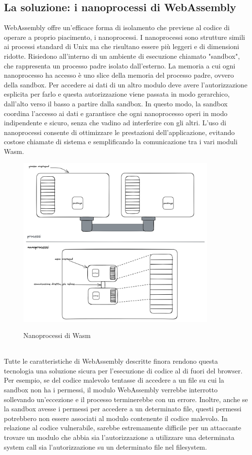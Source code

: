 \subsection{La soluzione: i nanoprocessi di WebAssembly}
WebAssembly offre un'efficace forma di isolamento che previene al codice di operare a proprio piacimento, i
nanoprocessi\cite{wasm-nano-processes}. I nanoprocessi sono strutture simili ai processi standard di Unix ma che
risultano essere più leggeri e di dimensioni ridotte. Risiedono all'interno di un ambiente di esecuzione chiamato
"sandbox", che rappresenta un processo padre isolato dall'esterno. La memoria a cui ogni nanoprocesso ha accesso è uno
slice della memoria del processo padre, ovvero della sandbox. Per accedere ai dati di un altro modulo deve avere
l'autorizzazione esplicita per farlo e questa autorizzazione viene passata in modo gerarchico, dall'alto verso il basso
a partire dalla sandbox. In questo modo, la sandbox coordina l'accesso ai dati e garantisce che ogni nanoprocesso operi
in modo indipendente e sicuro, senza che vadino ad interferire con gli altri. L'uso di nanoprocessi consente di
ottimizzare le prestazioni dell'applicazione, evitando costose chiamate di sistema e semplificando la comunicazione tra
i vari moduli Wasm.
\begin{figure}[h]
    \centering
    \captionsetup{justification=centering}
    \includegraphics[width=10cm]{./chapters/2.wasi-in-depth/images/4.nanoprocesses.png}
    \label{nanoprocesses}
    \caption{Nanoprocessi di Wasm}
\end{figure}
\\
Tutte le caratteristiche di WebAssembly descritte finora rendono questa tecnologia una soluzione sicura per l'esecuzione
di codice al di fuori del browser. Per esempio, se del codice malevolo tentasse di accedere a un file su cui la sandbox
non ha i permessi, il modulo WebAssembly verrebbe interrotto sollevando un'eccezione e il processo terminerebbe con un
errore. Inoltre, anche se la sandbox avesse i permessi per accedere a un determinato file, questi permessi potrebbero
non essere associati al modulo contenente il codice malevolo. In relazione al codice vulnerabile, sarebbe estremamente
difficile per un attaccante trovare un modulo che abbia sia l'autorizzazione a utilizzare una determinata system call
sia l'autorizzazione su un determinato file nel filesystem.
